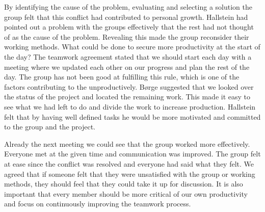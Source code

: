By identifying the cause of the problem, evaluating and selecting a solution the group felt that this conflict had contributed to personal growth. Hallstein had pointed out a problem with the groups effectively that the rest had not thought of as the cause of the problem. Revealing this made the group reconsider their working methods. What could be done to secure more productivity at the start of the day? The teamwork agreement stated that we should start each day with a meeting where we updated each other on our progress and plan the rest of the day. The group has not been good at fulfilling this rule, which is one of the factors contributing to the unproductively. Børge suggested that we looked over the status of the project and located the remaining work. This made it easy to see what we had left to do and divide the work to increase production. Hallstein felt that by having well defined tasks he would be more motivated and committed to the group and the project.  

Already the next meeting we could see that the group worked more effectively. Everyone met at the given time and communication was improved. The group felt at ease since the conflict was resolved and everyone had said what they felt. We agreed that if someone felt that they were unsatisfied with the group or working methods, they should feel that they could take it up for discussion. It is also important that every member should be more critical of our own productivity and focus on continuously improving the teamwork process.  
